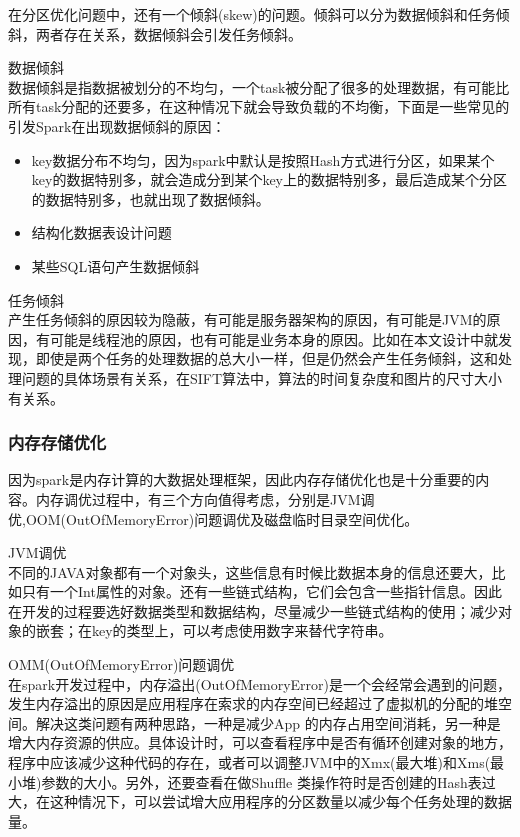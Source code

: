 在分区优化问题中，还有一个倾斜(skew)的问题。倾斜可以分为数据倾斜和任务倾斜，两者存在关系，数据倾斜会引发任务倾斜。
\begin{compactenum}
\item 数据倾斜\\数据倾斜是指数据被划分的不均匀，一个task被分配了很多的处理数据，有可能比所有task分配的还要多，在这种情况下就会导致负载的不均衡，下面是一些常见的引发Spark在出现数据倾斜的原因：
\begin{itemize}
\item key数据分布不均匀，因为spark中默认是按照Hash方式进行分区，如果某个key的数据特别多，就会造成分到某个key上的数据特别多，最后造成某个分区的数据特别多，也就出现了数据倾斜。
\item 结构化数据表设计问题
\item 某些SQL语句产生数据倾斜
\end{itemize}

\item 任务倾斜\\产生任务倾斜的原因较为隐蔽，有可能是服务器架构的原因，有可能是JVM的原因，有可能是线程池的原因，也有可能是业务本身的原因。比如在本文设计中就发现，即使是两个任务的处理数据的总大小一样，但是仍然会产生任务倾斜，这和处理问题的具体场景有关系，在SIFT算法中，算法的时间复杂度和图片的尺寸大小有关系。
\end{compactenum}

\subsubsection{内存存储优化}
因为spark是内存计算的大数据处理框架，因此内存存储优化也是十分重要的内容。内存调优过程中，有三个方向值得考虑，分别是JVM调优,OOM(OutOfMemoryError)问题调优及磁盘临时目录空间优化。
\begin{compactenum}
\item JVM调优\\不同的JAVA对象都有一个对象头，这些信息有时候比数据本身的信息还要大，比如只有一个Int属性的对象。还有一些链式结构，它们会包含一些指针信息。因此在开发的过程要选好数据类型和数据结构，尽量减少一些链式结构的使用；减少对象的嵌套；在key的类型上，可以考虑使用数字来替代字符串。
\item OMM(OutOfMemoryError)问题调优\\在spark开发过程中，内存溢出(OutOfMemoryError)是一个会经常会遇到的问题，发生内存溢出的原因是应用程序在索求的内存空间已经超过了虚拟机的分配的堆空间。解决这类问题有两种思路，一种是减少App 的内存占用空间消耗，另一种是增大内存资源的供应。具体设计时，可以查看程序中是否有循环创建对象的地方，程序中应该减少这种代码的存在，或者可以调整JVM中的Xmx(最大堆)和Xms(最小堆)参数的大小。另外，还要查看在做Shuffle 类操作符时是否创建的Hash表过大，在这种情况下，可以尝试增大应用程序的分区数量以减少每个任务处理的数据量。
\end{compactenum}

